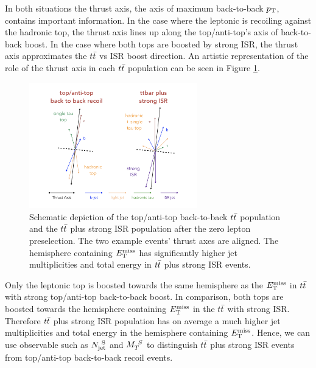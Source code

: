 \indent In both situations the thrust axis, the axis of maximum back-to-back $p_{\mathrm{T}}$, contains important information.  In the case where the leptonic is recoiling against the hadronic top, the thrust axis lines up along the top/anti-top's axis of back-to-back boost.  In the case where both tops are boosted by strong ISR, the thrust axis approximates the $\ttbar$ vs ISR boost direction. An artistic representation of the role of the thrust axis in each $\ttbar$ population can be seen in Figure \ref{fig:ttbar:2pop}. \\

\begin{figure}[h!]
  \centering
	\includegraphics[width=0.65\textwidth]{./figures/strategy/ttbar_2pop.png}
	\caption[Schematic depiction of the top/anti-top back-to-back $\ttbar$ population and the $\ttbar$ plus strong ISR population after the zero lepton preselection.]{Schematic depiction of the top/anti-top back-to-back $\ttbar$ population and the $\ttbar$ plus strong ISR population after the zero lepton preselection. The two example events' thrust axes are aligned.  The hemisphere containing $E_{\mathrm{T}}^{\mathrm{miss}}$ has significantly higher jet multiplicities and total energy in $\ttbar$ plus strong ISR events. }
\label{fig:ttbar:2pop}
\end{figure}

\indent Only the leptonic top is boosted towards the same hemisphere as the $E_{\mathrm{T}}^{\mathrm{miss}}$ in $\ttbar$ with strong top/anti-top back-to-back boost.  In comparison, both tops are boosted towards the hemisphere containing $E_{\mathrm{T}}^{\mathrm{miss}}$ in the $\ttbar$ with strong ISR. Therefore $\ttbar$ plus strong ISR population has on average a much higher jet multiplicities and total energy in the hemisphere containing $E_{\mathrm{T}}^{\mathrm{miss}}$.  Hence, we can use observable such as $N_{\mathrm{jet}}^{~\mathrm{S}}$ and $M_{T}^{~S}$ to distinguish $\ttbar$ plus strong ISR events from top/anti-top back-to-back recoil events.   \\

